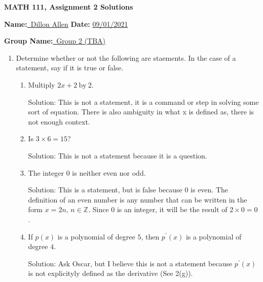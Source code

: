 \documentclass[11pt]{amsart}
\newcommand{\Z}{\mathbb{Z}}
\begin{document}
\begin{center}
\textbf{MATH 111, Assignment 2 Solutions}%
\end{center}

\vspace{.3 in}

\textbf{Name:}\underline{\ Dillon Allen} \hspace{1in} \textbf{Date:} \underline{09/01/2021}%

\textbf{Group Name:}\underline{\ Group 2 (TBA)}

\vspace{.3in}

\begin{enumerate}

\item Determine whether or not the following are staements. In the case of a statement, say if it is true or false.

\begin{enumerate}
	\item Multiply $2x + 2 \ \text{by} \ 2.$
	
	Solution: This is not a statement, it is a command or step in solving some sort of equation. There is also ambiguity in what x is defined as, there is not enough context.
	
	\item Is $3 \times 6 = 15$?
	
	Solution: This is not a statement because it is a question.
	
	\item The integer $0$ is neither even nor odd.
	
	Solution: This is a statement, but is false because $0$ is even. The definition of an even number is any number that can be written in the form $x = 2n, \, n \in \Z$. Since $0$ is an integer, it will be the result of $2 \times 0 = 0$.
	
	\item If $p\left(x\right)$ is a polynomial of degree $5$, then $p^{'}\left(x\right)$ is a polynomial of degree $4$.
	
	Solution: Ask Oscar, but I believe this is not a statement because $p^{'}\left(x\right)$ is not explicityly defined as the derivative (See 2(g)).
\end{enumerate}

\end{enumerate}
\end{document}
